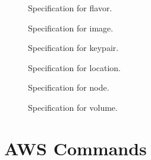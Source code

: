 \documentclass[9pt,twocolumn,twoside]{../../styles/osajnl}
\begin{document}
\begin{figure}[htb]
\vspace{-1.0\baselineskip}
\caption{Specification for flavor.}\label{F:spec-flavor}
\end{figure}

\begin{figure}[htb]
\vspace{-1.0\baselineskip}
\caption{Specification for image.}\label{F:spec-image}
\end{figure}

\begin{figure}[htb]
\vspace{-1.0\baselineskip}
\caption{Specification for keypair.}\label{F:spec-keypair}
\end{figure}

\begin{figure}[htb]
\vspace{-1.0\baselineskip}
\caption{Specification for location.}\label{F:spec-location}
\end{figure}

\begin{figure}[htb]
\vspace{-1.0\baselineskip}
\caption{Specification for node.}\label{F:spec-node}
\end{figure}

\begin{figure}[htb]
\vspace{-1.0\baselineskip}
\caption{Specification for volume.}\label{F:spec-volume}
\end{figure}

\section{AWS Commands}
\end{document}
